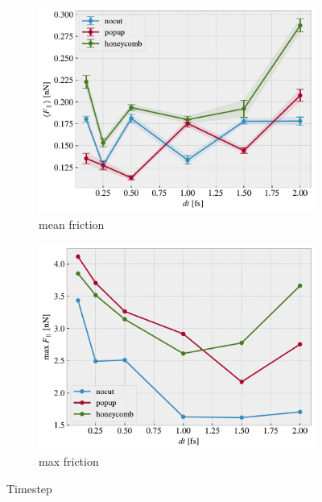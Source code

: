 \begin{figure}[H]
  \centering
  \begin{subfigure}[b]{0.49\textwidth}
      \centering
      \includegraphics[width=\textwidth]{figures/baseline/variables_dt_mean_K30.pdf}
      \caption{mean friction}
      \label{fig:var_dt_mean}
  \end{subfigure}
  \hfill
  \begin{subfigure}[b]{0.49\textwidth}
      \centering
      \includegraphics[width=\textwidth]{figures/baseline/variables_dt_max_K30.pdf}
      \caption{max friction}
      \label{fig:var_dt_max}
  \end{subfigure}
  \hfill
     \caption{Timestep}
     \label{fig:var_dt}
\end{figure}




